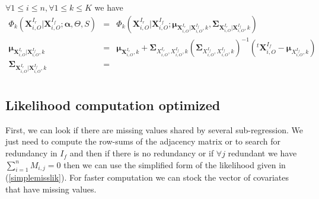\documentclass[11pt,a4paper]{report}
\begin{document}
		
		$\forall 1\leq i \leq n, \forall 1\leq k \leq K$ we have
\begin{eqnarray}
		\Phi_k(\boldsymbol{X}^{I_r}_{i,O}|\boldsymbol{X}^{I_f}_{i,O};\boldsymbol{\alpha},\Theta,S)&=&\Phi_k(\boldsymbol{X}^{I_r}_{i,O}|\boldsymbol{X}^{I_f}_{i,O};\boldsymbol{\mu}_{\boldsymbol{X}^{I_r}_{i,O}|\boldsymbol{X}^{I_f}_{i,O},k},\boldsymbol{\Sigma}_{\boldsymbol{X}^{I_r}_{i,O}|\boldsymbol{X}^{I_f}_{i,O},k})\\
		\boldsymbol{\mu}_{\boldsymbol{X}^{I_r}_{i,O}|\boldsymbol{X}^{I_f}_{i,O},k}&=& 
				\boldsymbol{\mu}_{\boldsymbol{X}^{I_r}_{i,O},k}+
				\boldsymbol{\Sigma}_{X_{i,O}^{I_r},X_{i,O}^{I_f},k}(\boldsymbol{\Sigma}_{X_{i,O}^{I_f},X_{i,O}^{I_f},k})^{-1}
				( ^t\boldsymbol{X}_{i,O}^{I_f}-\boldsymbol{\mu}_{X^{I_f}_{i,O},k})\\
		\boldsymbol{\Sigma}_{\boldsymbol{X}^{I_r}_{i,O}|\boldsymbol{X}^{I_f}_{i,O},k}&=& \\
\end{eqnarray}		
		
	\subsection{Likelihood computation optimized}
		First, we can look if there are missing values shared by several sub-regression. We just need to compute the  row-sums of the adjacency matrix or to search for redundancy in $I_f$ and then if there is no redundancy or if $\forall j$ redundant we have $\sum_{i=1}^nM_{i,j}=0$ then we can use the simplified form of the likelihood given in (\ref{simplemisslik}). For faster computation we can stock the vector of covariates that have missing values.
\end{document}
